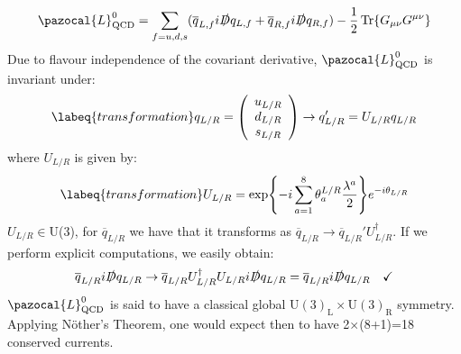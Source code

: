 \documentclass[../main.tex]{subfiles}
\begin{document}
\[
\pazocal{L}_{\text{QCD}}^0=\sum_{f=u,d,s}(\overline{q}_{L,f}i\slashed{D}q_{L,f}+\overline{q}_{R,f}i\slashed{D}q_{R,f})-\frac{1}{2}\Tr{G_{\mu\nu}G^{\mu\nu}}
\]
Due to flavour independence of the covariant derivative, $\pazocal{L}_{\text{QCD}}^0$ is invariant under:
\[
\labeq{transformation}
q_{L/R}=\left(\begin{array}{c}
    u_{L/R}\\
    d_{L/R}\\
    s_{L/R}
\end{array}\right)\to q_{L/R}'=U_{L/R}q_{L/R}
\]
where $U_{L/R}$ is given by:
\begin{equation}
\labeq{transformation}
U_{L/R}=\exp{-i\sum_{a=1}^8\theta_a^{L/R}\frac{\lambda^a}{2}}e^{-i\theta_{L/R}}
\end{equation}
$U_{L/R}\in$U(3), for $\overline{q}_{L/R}$ we have that it transforms as $\overline{q}_{L/R}\to\overline{q}_{L/R}'U_{L/R}^\dagger$. If we perform explicit computations, we easily obtain:
\[
\overline{q}_{L/R}i\slashed{D}q_{L/R}\to\overline{q}_{L/R}U_{L/R}^\dagger U_{L/R}i\slashed{D}q_{L/R}=\overline{q}_{L/R}i\slashed{D}q_{L/R} \quad \checkmark
\]
$\pazocal{L}_{\text{QCD}}^0$ is said to have a classical global U$(3)_{\text{L}}\times$U$(3)_{\text{R}}$ symmetry. Applying N\"other's Theorem, one would expect then to have 2$\times$(8+1)=18 conserved currents.
\end{document}
